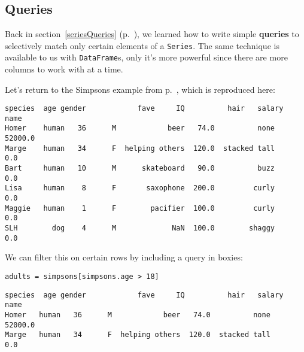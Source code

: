 
\chapter[Tables in Python (3 of 3)]{\huge\selectfont{Tables in Python (3 of
3)}}
\label{tablesInPython3}

\section{Queries}

\label{queries}

Back in section~\ref{seriesQueries} (p.~\pageref{seriesQueries}), we learned
how to write simple \textbf{queries} to selectively match only certain elements
of a \texttt{Series}. The same technique is available to us with
\texttt{DataFrame}s, only it's more powerful since there are more columns to
work with at a time.


Let's return to the Simpsons example from p.~\pageref{finalSimpsons}, which is
reproduced here:

\begin{Verbatim}[fontsize=\scriptsize,samepage=true,frame=leftline,framesep=5mm,framerule=1mm]
       species  age gender            fave     IQ          hair   salary
name                                                                    
Homer    human   36      M            beer   74.0          none  52000.0
Marge    human   34      F  helping others  120.0  stacked tall      0.0
Bart     human   10      M      skateboard   90.0          buzz      0.0
Lisa     human    8      F       saxophone  200.0         curly      0.0
Maggie   human    1      F        pacifier  100.0         curly      0.0
SLH        dog    4      M             NaN  100.0        shaggy      0.0
\end{Verbatim}


We can filter this on certain rows by including a query in boxies:


\begin{Verbatim}[fontsize=\normalsize,samepage=true,frame=single,framesep=3mm]
adults = simpsons[simpsons.age > 18]
\end{Verbatim}
\vspace{-.2in}

\begin{Verbatim}[fontsize=\scriptsize,samepage=true,frame=leftline,framesep=5mm,framerule=1mm]
      species  age gender            fave     IQ          hair   salary
name                                                                   
Homer   human   36      M            beer   74.0          none  52000.0
Marge   human   34      F  helping others  120.0  stacked tall      0.0
\end{Verbatim}

